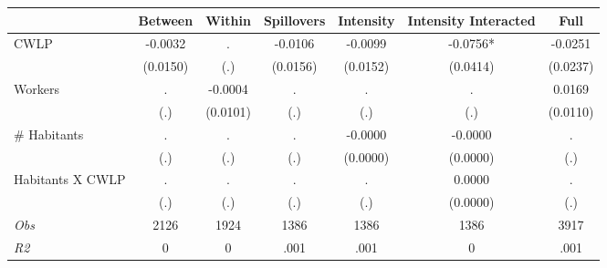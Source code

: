 \begin{tabular}{l*{6}{c}}\hline&\multicolumn{1}{c}{Between}&\multicolumn{1}{c}{Within}&\multicolumn{1}{c}{Spillovers}&\multicolumn{1}{c}{Intensity}&\multicolumn{1}{c}{Intensity Interacted}&\multicolumn{1}{c}{Full}\\ \hline 
CWLP & -0.0032 & . & -0.0106 & -0.0099 & -0.0756* & -0.0251 \\
 & (0.0150) & (.) & (0.0156) & (0.0152) & (0.0414) & (0.0237) \\
Workers & . & -0.0004 & . & . & . & 0.0169 \\
 & (.) & (0.0101) & (.) & (.) & (.) & (0.0110) \\
\# Habitants & . & . & . & -0.0000 & -0.0000 & . \\
 & (.) & (.) & (.) & (0.0000) & (0.0000) & (.) \\
Habitants X CWLP & . & . & . & . & 0.0000 & . \\
 & (.) & (.) & (.) & (.) & (0.0000) & (.) \\
\hline \textit{Obs} & 2126 & 1924 & 1386 & 1386 & 1386 & 3917 \\ \textit{R2} & 0 & 0 & .001 & .001 & 0 & .001 \\ \hline \end{tabular}
